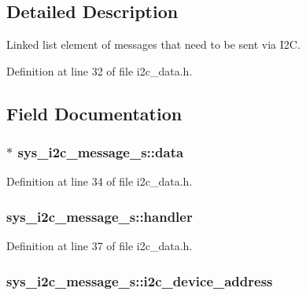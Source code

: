 \subsection{Detailed Description}
Linked list element of messages that need to be sent via I2\+C. 

Definition at line 32 of file i2c\+\_\+data.\+h.



\subsection{Field Documentation}
\hypertarget{structsys__i2c__message__s_a49fa3d575b300fed2ea06cf331fa2180}{}
\subsubsection[{data}]{$\ast$ sys\+\_\+i2c\+\_\+message\+\_\+s\+::data}\label{structsys__i2c__message__s_a49fa3d575b300fed2ea06cf331fa2180}


Definition at line 34 of file i2c\+\_\+data.\+h.

\hypertarget{structsys__i2c__message__s_a8632203d9a89893cb761ec37356c2288}{}
\subsubsection[{handler}]{ sys\+\_\+i2c\+\_\+message\+\_\+s\+::handler}\label{structsys__i2c__message__s_a8632203d9a89893cb761ec37356c2288}


Definition at line 37 of file i2c\+\_\+data.\+h.

\hypertarget{structsys__i2c__message__s_ad5b59be1fb573e7bc9b9b89da842c4aa}{}
\subsubsection[{i2c\+\_\+device\+\_\+address}]{ sys\+\_\+i2c\+\_\+message\+\_\+s\+::i2c\+\_\+device\+\_\+address}\label{structsys__i2c__message__s_ad5b59be1fb573e7bc9b9b89da842c4aa}


